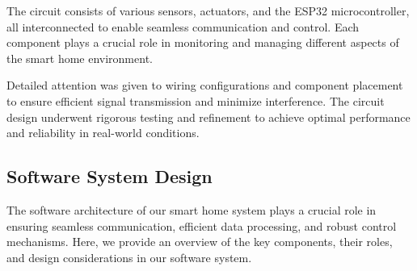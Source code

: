 The circuit consists of various sensors, actuators, and the ESP32 microcontroller, all interconnected to enable seamless communication and control. Each component plays a crucial role in monitoring and managing different aspects of the smart home environment.

Detailed attention was given to wiring configurations and component placement to ensure efficient signal transmission and minimize interference. The circuit design underwent rigorous testing and refinement to achieve optimal performance and reliability in real-world conditions.


\subsection{Software System Design}
The software architecture of our smart home system plays a crucial role in ensuring seamless communication, efficient data processing, and robust control mechanisms. Here, we provide an overview of the key components, their roles, and design considerations in our software system.

